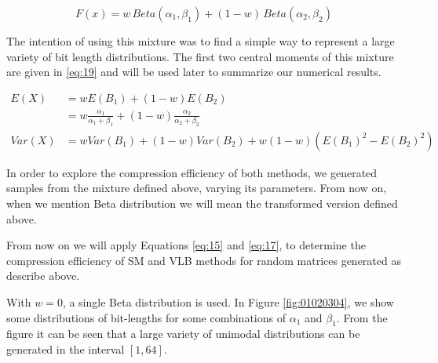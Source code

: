 \documentclass[10pt]{article}
\begin{document}
\begin{equation}\label{eq:18}
 F(x) =  w \, Beta(\alpha_1,\beta_1) + (1-w)\,Beta(\alpha_2,\beta_2)
\end{equation}

The intention of using this mixture was to find a simple way to represent a large variety of bit length distributions. The first two central moments of this mixture are given in \ref{eq:19} and will be used later to summarize our numerical results.

\begin{align}\label{eq:19}
 E(X) &= w E(B_1) + (1-w) E(B_2) \nonumber \\
 &= w \frac{\alpha_1}{\alpha_1+\beta_1} + (1-w)\frac{\alpha_2}{\alpha_2+\beta_2}\nonumber \\
 Var(X) &= w Var(B_1) + (1-w) Var(B_2) + w (1-w) (E(B_1)^2 - E(B_2)^2)
\end{align}

In order to explore the compression efficiency of both methods, we generated samples from the mixture defined above, varying its parameters. From now on, when we mention Beta distribution we will mean the transformed version defined above.

From now on we will apply Equations \ref{eq:15} and \ref{eq:17}, to determine the compression efficiency of SM and VLB methods for random matrices generated as describe above. 

With $w=0$, a single Beta distribution is used. In Figure \ref{fig:01020304}, we show some distributions of bit-lengths for some combinations of $\alpha_1$ and $\beta_1$. From the figure it can be seen that a large variety of unimodal distributions can be generated in the interval $[1,64]$.
 
\end{document}
